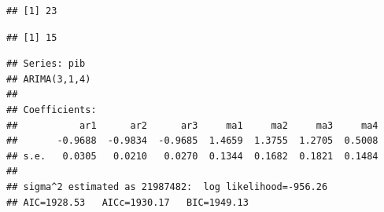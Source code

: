 \documentclass[
]{article}
\newenvironment{Shaded}{\begin{snugshade}}{\end{snugshade}}
\newcommand{\DecValTok}[1]{\textcolor[rgb]{0.00,0.00,0.81}{#1}}
\newcommand{\KeywordTok}[1]{\textcolor[rgb]{0.13,0.29,0.53}{\textbf{#1}}}
\newcommand{\NormalTok}[1]{#1}
\newcommand{\OperatorTok}[1]{\textcolor[rgb]{0.81,0.36,0.00}{\textbf{#1}}}
\newcommand{\StringTok}[1]{\textcolor[rgb]{0.31,0.60,0.02}{#1}}
\begin{document}
\begin{Shaded}
\end{Shaded}

\begin{verbatim}
## [1] 23
\end{verbatim}

\begin{Shaded}
\end{Shaded}

\begin{verbatim}
## [1] 15
\end{verbatim}

\begin{Shaded}
\end{Shaded}

\begin{verbatim}
## Series: pib 
## ARIMA(3,1,4) 
## 
## Coefficients:
##           ar1      ar2      ar3     ma1     ma2     ma3     ma4
##       -0.9688  -0.9834  -0.9685  1.4659  1.3755  1.2705  0.5008
## s.e.   0.0305   0.0210   0.0270  0.1344  0.1682  0.1821  0.1484
## 
## sigma^2 estimated as 21987482:  log likelihood=-956.26
## AIC=1928.53   AICc=1930.17   BIC=1949.13
\end{verbatim}
\end{document}
